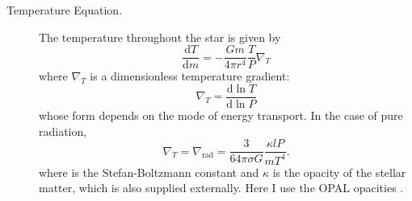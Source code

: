 \begin{description}
    
    
    \item[Temperature Equation.]
    The temperature throughout the star is given by 
    \begin{equation} \label{eq:temperature} \boxed{
        \frac{\text{d}T}{\text{d}m}
        =
        -\frac{Gm}{4\pi r^4} \frac{T}{P} \nabla_T
    }\end{equation}
    where $\nabla_T$ is a dimensionless temperature gradient:
    \begin{equation}
        \nabla_T 
        =
        \frac{\text{d}\ln T}{\text{d}\ln P}
    \end{equation}
    whose form depends on the mode of energy transport. 
    In the case of pure radiation,
    \begin{equation} \label{eq:radiative-gradiant}
        \nabla_T 
        = 
        \nabla_{\text{rad}} 
        =
        \frac{3}{64\pi \sigma G}
        \frac{\kappa l P}{m T^4}.
    \end{equation}
    where 
    is the Stefan-Boltzmann constant and $\kappa$ is the opacity of the stellar matter, which is also supplied externally. 
    Here I use the \textsc{OPAL} opacities \citep{1996ApJ...464..943I}. 
    

\end{description}
